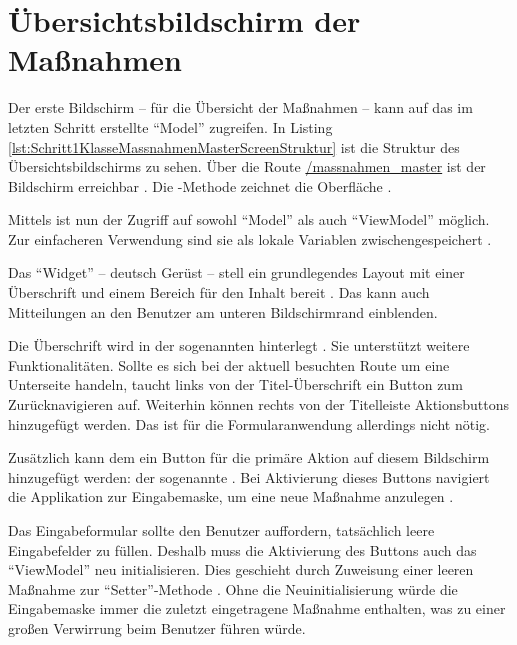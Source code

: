 \ifodd\value{page}\hbox{}\newpage\fi
\section{Übersichtsbildschirm der Maßnahmen}

Der erste Bildschirm -- für die Übersicht der Maßnahmen -- kann auf das im letzten Schritt erstellte \enquote{Model} zugreifen.
In Listing \ref{lst:Schritt1KlasseMassnahmenMasterScreenStruktur}  ist die Struktur des Übersichtsbildschirms zu sehen.
Über die Route \url{/massnahmen_master} ist der Bildschirm erreichbar . Die -Methode zeichnet die Oberfläche .

Mittels  ist nun der Zugriff auf sowohl \enquote{Model} als auch \enquote{ViewModel} möglich. Zur einfacheren Verwendung sind sie als lokale Variablen zwischengespeichert .

Das \enquote{Widget}  -- deutsch Gerüst --  stell  ein grundlegendes Layout mit einer Überschrift und einem Bereich für den Inhalt bereit .
Das  kann auch Mitteilungen an den Benutzer am unteren Bildschirmrand einblenden.

Die Überschrift wird in der sogenannten  hinterlegt .
Sie unterstützt weitere Funktionalitäten.
Sollte es sich bei der aktuell besuchten Route  um eine Unterseite handeln, taucht links von der Titel-Überschrift ein Button zum Zurücknavigieren auf. 
Weiterhin können rechts von der Titelleiste Aktionsbuttons hinzugefügt werden. Das ist für die Formularanwendung allerdings nicht nötig.

Zusätzlich kann dem  ein Button für die primäre Aktion auf diesem Bildschirm hinzugefügt werden: der sogenannte  .
Bei Aktivierung dieses Buttons navigiert die Applikation zur Eingabemaske, um eine neue Maßnahme anzulegen .

Das Eingabeformular sollte den Benutzer auffordern, tatsächlich leere Eingabefelder zu füllen.
Deshalb muss die Aktivierung des Buttons auch das \enquote{ViewModel} neu initialisieren.
Dies geschieht durch Zuweisung einer leeren Maßnahme zur \enquote{Setter}-Methode  .
Ohne die Neuinitialisierung würde die Eingabemaske immer die zuletzt eingetragene Maßnahme enthalten, was zu einer großen Verwirrung beim Benutzer führen würde.

